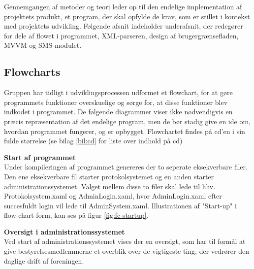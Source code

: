 \label{sec:implementering}

Gennemgangen af metoder og teori leder op til den endelige implementation af projektets produkt, et program, der skal opfylde de krav, som er stillet i kontekst med projektets udvikling. Følgende afsnit indeholder underafsnit, der redegører for dele af flowet i programmet, XML-parseren, design af brugergrænsefladen, MVVM og SMS-modulet.

\subsection{Flowcharts}
Gruppen har tidligt i udviklingsprocessen udformet et flowchart, for at gøre programmets funktioner overskuelige og sørge for, at disse funktioner blev indkodet i programmet. De følgende diagrammer viser ikke nødvendigvis en præcis repræsentation af det endelige program, men de bør stadig give en ide om, hvordan programmet fungerer, og er opbygget. Flowchartet findes på cd'en i sin fulde størrelse (se bilag \ref{bil:cd} for liste over indhold på cd)



{\textbf{Start af programmet}}\\
Under kompileringen af programmet genereres der to seperate eksekverbare filer. Den ene eksekverbare fil starter protokolsystemet og en anden starter administrationssystemet. Valget mellem disse to filer skal lede til hhv. Protokolsystem.xaml og AdminLogin.xaml, hvor AdminLogin.xaml efter succesfuldt login vil lede til AdminSystem.xaml. Illustrationen af "Start-up" i flow-chart form, kan ses på figur \ref{fig:fc-startup}.


{\textbf{Oversigt i administrationssystemet}}\\
Ved start af administrationssystemet vises der en oversigt, som har til formål at give bestyrelsesmedlemmerne et overblik over de vigtigeste ting, der vedrører den daglige drift af foreningen.\\

